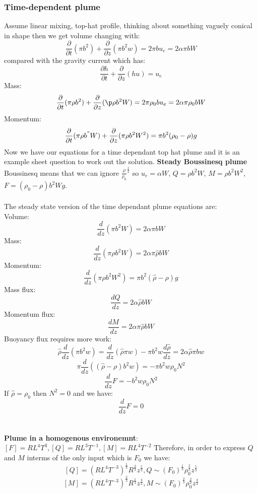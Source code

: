 \documentclass{article}
\begin{document}
\subsubsection{Time-dependent plume}
Assume linear mixing, top-hat profile, thinking about something vaguely conical in shape then we get volume changing with:
$$
 \frac{\partial}{\partial t} (\pi b^2) + \frac{\partial}{\partial z} ( \pi b^2 w) = 2 \pi b u_e = 2 \alpha \pi b W
$$
compared with the gravity current which has:
$$
 \frac{\partial h}{\partial t} + \frac{\partial}{\partial z} (hu) = u_e
$$
Mass:
$$
\frac{\partial}{\partial t} ( \pi \rho b^2) + \frac{\partial}{\partial z} ( \p \rho b^2 W) = 2 \pi \rho_0 b u_e = 2 \alpha \pi \rho_0 b W
$$
Momentum:
$$
 \frac{\partial}{\partial t} ( \pi \rho b^" W) + \frac{\partial}{\partial z} ( \pi \rho b^2 W^2) = \pi b^2 ( \rho_0 - \rho) g
$$
Now we have our equations for a time dependant top hat plume and it is an example sheet question to work out the solution.
\textbf{Steady Boussinesq plume}\\
Boussinesq means that we can ignore $\frac{\rho}{\rho_0}^{\frac{1}{2}}$ so $u_e = \alpha W$, $Q = \rho b^2 W$, $M= \rho b^2 W^2$, $F = (\rho_0 - \rho) b^2 W g$.\\\\ 
The steady state version of the time dependant plume equations are:\\
Volume:
$$
 \frac{d}{dz} ( \pi b^2 W) = 2 \alpha \pi b W
$$
Mass:
$$
 \frac{d}{dz} ( \pi \rho b^2 W) = 2\alpha \pi \hat \rho b W
$$
Momentum:
$$
 \frac{d}{dz} ( \pi \rho b^2 W^2) = \pi b^2 (\hat \rho - \rho) g
$$
Mass flux:
$$
 \frac{dQ}{dz} = 2 \alpha \hat \rho b W
$$
Momentum flux:
$$
 \frac{dM}{dz} = 2 \alpha \pi \hat \rho bW
$$
Buoyancy flux requires more work:
$$
 \hat \rho \frac{d}{dz} ( \pi b^2 w) = \frac{d}{dz}( \hat \rho \pi w) - \pi b^2 w \frac{d\hat \rho}{dz} = 2 \alpha \hat \rho \pi b w
$$
$$
 \pi \frac{d}{dz} ( ( \hat \rho - \rho) b^2 w) = - \pi b^2 w \rho_0 N^2
$$
$$
 \frac{d}{dz} F = - b^2 w \rho_0 N^2
$$
If $\hat \rho = \rho_0$ then $N^2 = 0$ and we have:
$$
 \frac{d}{dz} F = 0
$$
\\\\
\textbf{Plume in a homogenous environemnt}:
$[ F] = R L^4 T^3, [ Q] = R L^3 T^{-1}, [ M] = R L^4 T^{-2}$
Therefore, in order to express $Q$ and $M$ interms of the only input which is $F_0$ we have:
$$
 [Q] = ( R L^4 T^{-3})^{\frac{1}{3}} R^{\frac{2}{3}} z^{\frac{5}{3}}, Q \sim ( F_0)^{\frac{1}{3}} \rho_0^{\frac{2}{3}} z^{\frac{5}{3}}
$$
$$
 [M] = ( RL^4 T^{-3})^{\frac{2}{3}} R^{\frac{1}{3}} z^{\frac{4}{3}}, M \sim ( F_0)^{\frac{2}{3}} \rho_0^{\frac{2}{3}} z^{\frac{4}{3}}
$$
\end{document}
